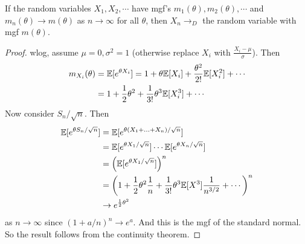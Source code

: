 %
\begin{note}
  \begin{field}
    \begin{thm}
      If the random variables $X_1, X_2, \cdots$ have mgf's $m_1(\theta), m_2(\theta), \cdots$ and $m_n(\theta) \to m(\theta)$ as $n\to\infty$ for all $\theta$, then $X_n \to_D $ the random variable with mgf $m(\theta)$.
    \end{thm}
  \end{field}
  \begin{field}
    \begin{proof}
      wlog, assume $\mu = 0, \sigma^2 = 1$ (otherwise replace $X_i$ with $\frac{X_i - \mu}{\sigma}$).
      Then
      \begin{align*}
        m_{X_i}(\theta) &= \mathbb{E}[e^{\theta X_i}] = 1 + \theta \mathbb{E}[X_i] + \frac{\theta^2}{2!} \mathbb{E}[X_i^2] + \cdots\\
        &=1 + \frac{1}{2}\theta^2 + \frac{1}{3!}\theta^3 \mathbb{E}[X_i^3] + \cdots
      \end{align*}
      Now consider $S_n/\sqrt{n}$. Then
      \begin{align*}
        \mathbb{E}[e^{\theta S_n/\sqrt{n}}] &= \mathbb{E}[e^{\theta(X_1 + \ldots + X_n)/\sqrt{n}}]\\
        &= \mathbb{E}[e^{\theta X_1/\sqrt{n}}] \cdots \mathbb{E}[e^{\theta X_n/\sqrt{n}}]\\
        &= \left(\mathbb{E}[e^{\theta X_1/\sqrt{n}}]\right)^n\\
        &= \left(1 + \frac{1}{2}\theta^2 \frac{1}{n} + \frac{1}{3!}\theta^3 \mathbb{E}[X^3]\frac{1}{n^{3/2}} + \cdots\right)^{n}\\
        &\to e^{\frac{1}{2}\theta^2}
      \end{align*}
      as $n \to \infty$ since $(1 + a/n)^n \to e^a$. And this is the mgf of the standard normal. So the result follows from the continuity theorem.
    \end{proof}
  \end{field}
  \xplain{}%
\end{note}

